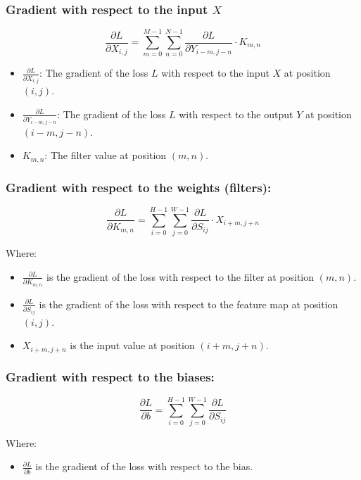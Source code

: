 \documentclass[a4paper, twocolumn, twoside]{article}
\begin{document}
    \subsubsection{Gradient with respect to the input \( X \)}

    \[
    \frac{\partial L}{\partial X_{i,j}} = \sum_{m=0}^{M-1} \sum_{n=0}^{N-1} \frac{\partial L}{\partial Y_{i-m,j-n}} \cdot K_{m,n}
    \]

    \begin{itemize}
      \item \( \frac{\partial L}{\partial X_{i,j}} \): The gradient of the loss \( L \) with respect to the input \( X \) at position \((i, j)\).
      \item \( \frac{\partial L}{\partial Y_{i-m,j-n}} \): The gradient of the loss \( L \) with respect to the output \( Y \) at position \((i-m, j-n)\).
      \item \( K_{m,n} \): The filter value at position \((m, n)\).
    \end{itemize}

    \subsubsection{Gradient with respect to the weights (filters):}
    \[
    \frac{\partial L}{\partial K_{m,n}} = \sum_{i=0}^{H-1} \sum_{j=0}^{W-1} \frac{\partial L}{\partial S_{ij}} \cdot X_{i+m, j+n}
    \]
    
    Where:
    \begin{itemize}
      \item \( \frac{\partial L}{\partial K_{m,n}} \) is the gradient of the loss with respect to the filter at position \( (m, n) \).
      \item \( \frac{\partial L}{\partial S_{ij}} \) is the gradient of the loss with respect to the feature map at position \( (i, j) \).
      \item \( X_{i+m, j+n} \) is the input value at position \( (i+m, j+n) \).
    \end{itemize}

    \subsubsection{Gradient with respect to the biases:}
    \[
    \frac{\partial L}{\partial b} = \sum_{i=0}^{H-1} \sum_{j=0}^{W-1} \frac{\partial L}{\partial S_{ij}}
    \]

    Where:
    \begin{itemize}
      \item \( \frac{\partial L}{\partial b} \) is the gradient of the loss with respect to the bias.
    \end{itemize}
\end{document}
